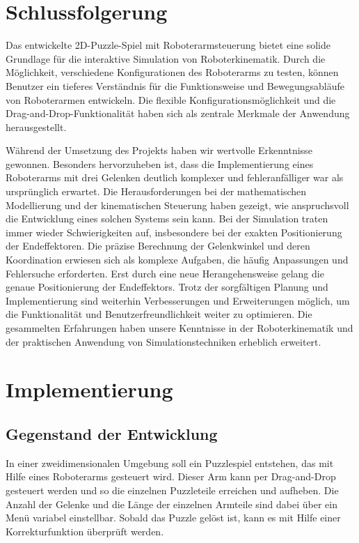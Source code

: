\documentclass[12pt]{article}
\begin{document}
    \section{Schlussfolgerung}
    Das entwickelte 2D-Puzzle-Spiel mit Roboterarmsteuerung bietet eine solide Grundlage für die interaktive
    Simulation von Roboterkinematik. Durch die Möglichkeit, verschiedene Konfigurationen des Roboterarms zu
    testen, können Benutzer ein tieferes Verständnis für die Funktionsweise und Bewegungsabläufe von Roboterarmen
    entwickeln. Die flexible Konfigurationsmöglichkeit und die Drag-and-Drop-Funktionalität haben sich als
    zentrale Merkmale der Anwendung herausgestellt.

    Während der Umsetzung des Projekts haben wir wertvolle Erkenntnisse gewonnen. Besonders hervorzuheben
    ist, dass die Implementierung eines Roboterarms mit drei Gelenken deutlich komplexer und fehleranfälliger
    war als ursprünglich erwartet. Die Herausforderungen bei der mathematischen Modellierung und der
    kinematischen Steuerung haben gezeigt, wie anspruchsvoll die Entwicklung eines solchen Systems sein kann.
    Bei der Simulation traten immer wieder Schwierigkeiten auf, insbesondere bei der exakten Positionierung der
    Endeffektoren. Die präzise Berechnung der Gelenkwinkel und deren Koordination erwiesen sich als komplexe
    Aufgaben, die häufig Anpassungen und Fehlersuche erforderten. Erst durch eine neue Herangehensweise gelang
    die genaue Positionierung der Endeffektors. Trotz der sorgfältigen Planung und Implementierung sind weiterhin
    Verbesserungen und Erweiterungen möglich, um die Funktionalität und Benutzerfreundlichkeit weiter zu
    optimieren. Die gesammelten Erfahrungen haben unsere Kenntnisse in der Roboterkinematik und der praktischen
    Anwendung von Simulationstechniken erheblich erweitert.


    \section{Implementierung}

    \subsection{Gegenstand der Entwicklung}
    In einer zweidimensionalen Umgebung soll ein Puzzlespiel entstehen, das mit Hilfe eines Roboterarms
    gesteuert wird. Dieser Arm kann per Drag-and-Drop gesteuert werden und so die einzelnen Puzzleteile
    erreichen und aufheben. Die Anzahl der Gelenke und die Länge der einzelnen Armteile sind dabei über
    ein Menü variabel einstellbar. Sobald das Puzzle gelöst ist, kann es mit Hilfe einer Korrekturfunktion
    überprüft werden.
\end{document}
